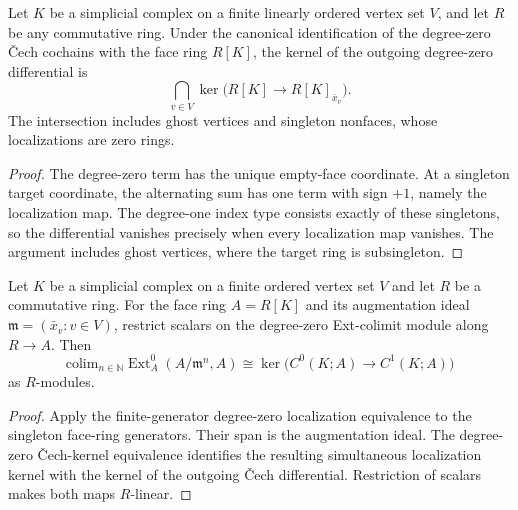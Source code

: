 \begin{lemma}\label{lem:cech-degree-zero-kernel}
Let $K$ be a simplicial complex on a finite linearly ordered vertex set $V$,
and let $R$ be any commutative ring. Under the canonical identification of
the degree-zero Čech cochains with the face ring $R[K]$, the kernel of the
outgoing degree-zero differential is
\[
  \bigcap_{v\in V}\ker\bigl(R[K]\longrightarrow R[K]_{\bar x_v}\bigr).
\]
The intersection includes ghost vertices and singleton nonfaces, whose
localizations are zero rings.
\leanok
\end{lemma}
\begin{proof}
The degree-zero term has the unique empty-face coordinate. At a singleton
target coordinate, the alternating sum has one term with sign $+1$, namely
the localization map. The degree-one index type consists exactly of these
singletons, so the differential vanishes precisely when every localization
map vanishes. The argument includes ghost vertices, where the target ring
is subsingleton.
\end{proof}

\begin{theorem}\label{thm:ext-zero-cech-cycles}
Let $K$ be a simplicial complex on a finite ordered vertex set $V$ and let
$R$ be a commutative ring. For the face ring $A=R[K]$ and its augmentation
ideal $\mathfrak m=(\bar x_v:v\in V)$, restrict scalars on the degree-zero
Ext-colimit module along $R\to A$. Then
\[
  \mathrm{colim}_{n\in\mathbb N}\operatorname{Ext}^0_A(A/\mathfrak m^n,A)
  \cong \ker\bigl(C^0(K;A)\longrightarrow C^1(K;A)\bigr)
\]
as $R$-modules.
\leanok
\end{theorem}
\begin{proof}
Apply the finite-generator degree-zero localization equivalence to the
singleton face-ring generators. Their span is the augmentation ideal. The
degree-zero Čech-kernel equivalence identifies the resulting simultaneous
localization kernel with the kernel of the outgoing Čech differential.
Restriction of scalars makes both maps $R$-linear.
\end{proof}

